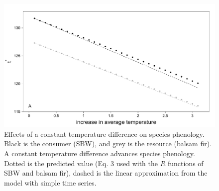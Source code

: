 \documentclass[12 pt]{article}
\begin{document}
\clearpage
\begin{figure}[ht]
\begin{center}
\renewcommand{\thefigure}{S\arabic{figure}}
\setcounter{figure}{0}
\includegraphics[width = 16 cm, keepaspectratio]{FigureS1}
\caption{\doublespacing Effects of a constant temperature difference on species phenology. Black is the consumer (SBW), and grey is the resource (balsam fir). A constant temperature difference advances species phenology. Dotted is the predicted value (Eq. 3 used with the $R$ functions of SBW and balsam fir), dashed is the linear approximation from the model with simple time series.}
\end{center}
\end{figure}
\end{document}
